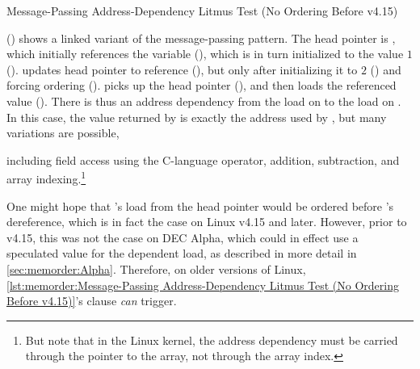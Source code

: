 \begin{listing}

\caption{Message-Passing Address-Dependency Litmus Test (No Ordering Before v4.15)}
\label{lst:memorder:Message-Passing Address-Dependency Litmus Test (No Ordering Before v4.15)}
\end{listing}

\begin{fcvref}
()
shows a linked variant of the message-passing pattern.
The head pointer is , which initially
references the  variable  (), which is in turn
initialized to the value $1$ ().
 updates head pointer  to reference  (),
but only after initializing it to $2$ () and forcing ordering
().
 picks up the head pointer  (), and then loads
the referenced value ().
There is thus an address dependency from the load on  to the
load on .
In this case, the value returned by  is exactly the address
used by , but many variations are possible,
\end{fcvref}
including field access using the C-language \co{->} operator,
addition, subtraction, and array indexing.\footnote{
	But note that in the Linux kernel, the address dependency must
	be carried through the pointer to the array, not through the
	array index.}

\begin{fcvref}
One might hope that 's load from the head pointer would be ordered
before 's dereference, which is in fact the case on Linux v4.15
and later.
However, prior to v4.15, this was not the case on DEC Alpha, which could
in effect use a speculated value for the dependent load, as described
in more detail in \cref{sec:memorder:Alpha}.
Therefore, on older versions of Linux,
\cref{lst:memorder:Message-Passing Address-Dependency Litmus Test (No Ordering Before v4.15)}'s
 clause \emph{can} trigger.
\end{fcvref}

